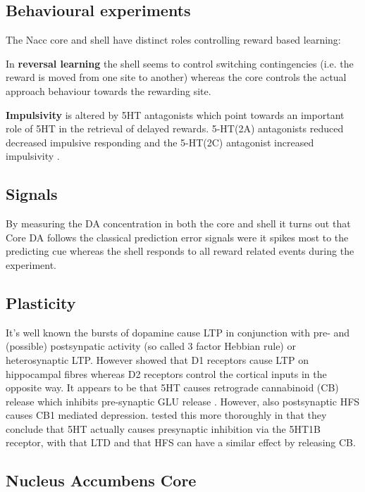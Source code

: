 \documentclass[12pt,a4paper]{article}
\begin{document}
\subsection{Behavioural experiments}
The Nacc core and shell have distinct roles controlling reward based learning:

In \textbf{reversal learning} \citep{Dalton2014} the shell seems to control
switching contingencies (i.e. the reward is moved from one site to
another) whereas the core controls the actual approach behaviour
towards the rewarding site.

\textbf{Impulsivity} is altered by 5HT antagonists which point towards an
important role of 5HT in the retrieval of delayed rewards. 5-HT(2A)
antagonists reduced decreased impulsive responding and the 5-HT(2C)
antagonist increased impulsivity \citep{Robinson2008}.

\subsection{Signals}
By measuring the DA concentration in both the core and shell
\citep{Saddoris2015} it turns out that Core DA follows the classical
prediction error signals were it spikes most to the predicting cue
whereas the shell responds to all reward related events during the
experiment.

\subsection{Plasticity}
It's well known the bursts of dopamine cause LTP in conjunction with
pre- and (possible) postsynpatic activity (so called 3 factor Hebbian
rule) or heterosynaptic LTP. However \citet{Goto2005} showed that D1
receptors cause LTP on hippocampal fibres whereas D2 receptors control
the cortical inputs in the opposite way.  It appears to be that 5HT
causes retrograde cannabinoid (CB) release which inhibits pre-synaptic
GLU release \citep{Burattini2014}. However, also postsynaptic HFS
causes CB1 mediated depression. \citet{Mathur2011} tested this more
thoroughly in that they conclude that 5HT actually causes presynaptic
inhibition via the 5HT1B receptor, with that LTD and that HFS can have
a similar effect by releasing CB.




\subsection{Nucleus Accumbens Core\label{core}}
\end{document}
